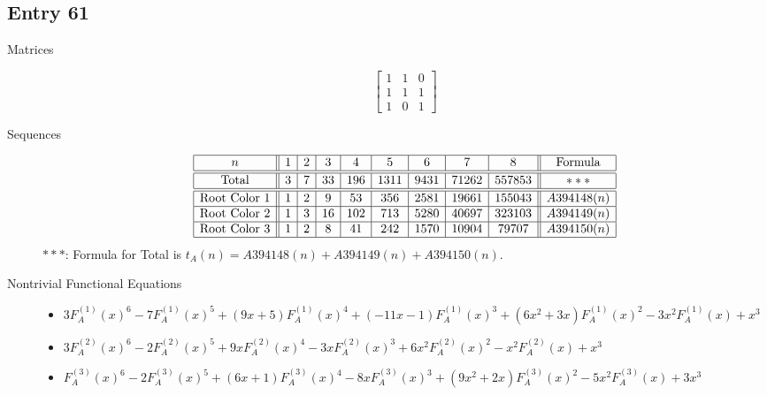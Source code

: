 \documentclass[12pt]{amsart}
\newcommand{\gff}[2]{F_{#2}^{(#1)}(x)}
\newcommand{\gfa}[1]{\gff{#1}{A}}
\begin{document}
\subsection*{Entry 61}
\begin{description}
    \item[Matrices]
    
    \[\begin{bmatrix}
1 & 1 & 0 \\
1 & 1 & 1 \\
1 & 0 & 1
\end{bmatrix}\]
    \item[Sequences]\hspace*{\fill}\vspace{-0.5cm}
    \begin{center}
        \[
        \begin{array}{|c||c|c|c|c|c|c|c|c||c|}\hline
           n  & 1 & 2 & 3 & 4 & 5 & 6 & 7 & 8  & \text{Formula}\\\hline\hline
           \text{Total}  & 3 & 7 & 33 & 196 & 1311 & 9431 & 71262 & 557853 & *** \\\hline\hline
           \text{Root Color }1 & 1 & 2 & 9 & 53 & 356 & 2581 & 19661 & 155043 & A394148(n) \\\hline
           \text{Root Color }2 & 1 & 3 & 16 & 102 & 713 & 5280 & 40697 & 323103 & A394149(n) \\\hline
           \text{Root Color }3 & 1 & 2 & 8 & 41 & 242 & 1570 & 10904 & 79707 & A394150(n) \\\hline
        \end{array}
        \]
        $***$: Formula for Total is $t_A(n)=A394148(n)+A394149(n)+A394150(n)$.
    \end{center}
    
    \item[Nontrivial Functional Equations]\hspace*{\fill}

    \begin{itemize}
\item $3\gfa{1}^6-7\gfa{1}^5+(9x + 5)\gfa{1}^4+(-11x - 1)\gfa{1}^3+(6x^2 + 3x)\gfa{1}^2-3x^2\gfa{1}+x^3$


\item $3\gfa{2}^6-2\gfa{2}^5+9x\gfa{2}^4-3x\gfa{2}^3+6x^2\gfa{2}^2-x^2\gfa{2}+x^3$


\item $\gfa{3}^6-2\gfa{3}^5+(6x + 1)\gfa{3}^4-8x\gfa{3}^3+(9x^2 + 2x)\gfa{3}^2-5x^2\gfa{3}+3x^3$


\end{itemize}
    
\end{description}
\end{document}
